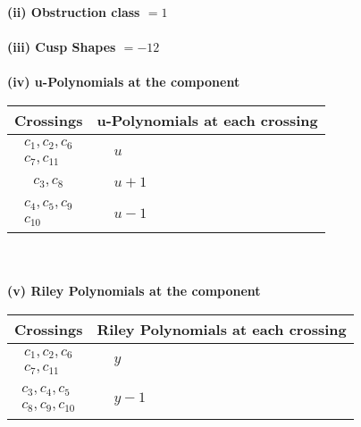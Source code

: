 \documentclass[1p]{elsarticle_modified}
\theoremstyle{definition}
\begin{document}
\flushleft \textbf{(ii) Obstruction class $= 1$}\\~\\
\flushleft \textbf{(iii) Cusp Shapes $= -12$}\\~\\
\newpage\renewcommand{\arraystretch}{1}
\flushleft \textbf{(iv) u-Polynomials at the component}\newline \\
\begin{tabular}{m{50pt}|m{274pt}}
Crossings & \hspace{64pt}u-Polynomials at each crossing \\
\hline $$\begin{aligned}c_{1},c_{2},c_{6}\\c_{7},c_{11}\end{aligned}$$&$\begin{aligned}
&u
\end{aligned}$\\
\hline $$\begin{aligned}c_{3},c_{8}\end{aligned}$$&$\begin{aligned}
&u+1
\end{aligned}$\\
\hline $$\begin{aligned}c_{4},c_{5},c_{9}\\c_{10}\end{aligned}$$&$\begin{aligned}
&u-1
\end{aligned}$\\
\hline
\end{tabular}\\~\\
\newpage\renewcommand{\arraystretch}{1}
\flushleft \textbf{(v) Riley Polynomials at the component}\newline \\
\begin{tabular}{m{50pt}|m{274pt}}
Crossings & \hspace{64pt}Riley Polynomials at each crossing \\
\hline $$\begin{aligned}c_{1},c_{2},c_{6}\\c_{7},c_{11}\end{aligned}$$&$\begin{aligned}
&y
\end{aligned}$\\
\hline $$\begin{aligned}c_{3},c_{4},c_{5}\\c_{8},c_{9},c_{10}\end{aligned}$$&$\begin{aligned}
&y-1
\end{aligned}$\\
\hline
\end{tabular}\\~\\
\end{document}
